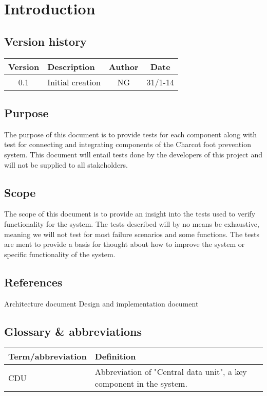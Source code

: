 \chapter{Introduction}
\section{Version history}
\begin{table}[H]
\begin{tabular}{|c|p{9cm}|c|c|}
\hline
Version & Description & Author & Date\\ \hline
0.1 & Initial creation & NG & 31/1-14 \\
\hline
\end{tabular}
\end{table}

\section{Purpose}
The purpose of this document is to provide tests for each component along with test for connecting and integrating components of the Charcot foot prevention system. This document will entail tests done by the developers of this project and will not be supplied to all stakeholders.

\section{Scope}
The scope of this document is to provide an insight into the tests used to verify functionality for the system. The tests described will by no means be exhaustive, meaning we will not test for most failure scenarios and some functions. The tests are ment to provide a basis for thought about how to improve the system or specific functionality of the system.

\section{References}
Architecture document
Design and implementation document

\section{Glossary \& abbreviations}
\begin{table}[H]
\centering
\begin{tabular}{|p{4cm}|p{7cm}|}
\hline
Term/abbreviation & Definition\\ \hline
CDU & Abbreviation of "Central data unit", a key component in the system. \\ \hline
\end{tabular}
\end{table}
